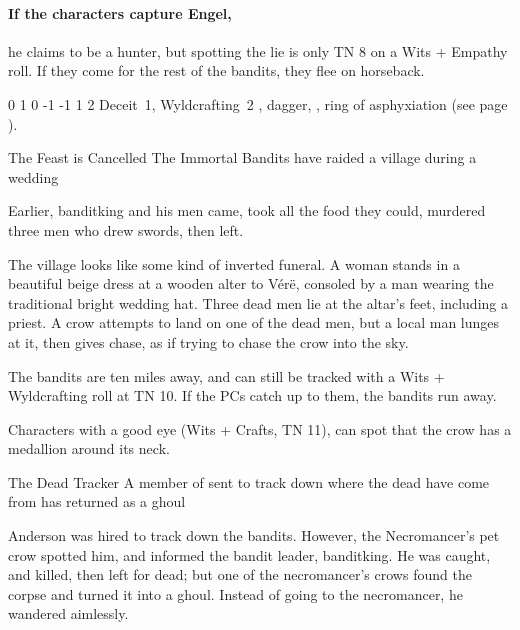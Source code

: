 \begin{multicols}{2}
\paragraph{If the characters capture Engel,}
he claims to be a hunter, but spotting the lie is only TN 8 on a Wits + Empathy roll.
If they come for the rest of the bandits, they flee on horseback.


{0}%
{1}%
{{0}%
{-1}%
{-1}}%
{1}%
{2}%
{Deceit~1, Wyldcrafting~2}%
{\shortsword, dagger, \partialleather, ring of asphyxiation (see page \pageref{ring_asphyxiation}).}%
{}

{The Feast is Cancelled}%
{The Immortal Bandits have raided a village during a wedding}%

Earlier, \gls{banditking} and his men came, took all the food they could, murdered three men who drew swords, then left.

\begin{boxtext}

	The village looks like some kind of inverted funeral.
	A woman stands in a beautiful beige dress at a wooden alter to V\'{e}r\"{e}, consoled by a man wearing the traditional bright wedding hat.
	Three dead men lie at the altar's feet, including a priest.
	A crow attempts to land on one of the dead men, but a local man lunges at it, then gives chase, as if trying to chase the crow into the sky.

\end{boxtext}

The bandits are ten miles away, and can still be tracked with a Wits + Wyldcrafting roll at TN 10.
If the PCs catch up to them, the bandits run away.

Characters with a good eye (Wits + Crafts, TN 11), can spot that the crow has a medallion around its neck.

{The Dead Tracker}%
{A member of  sent to track down where the dead have come from has returned as a ghoul}%

Anderson was hired to track down the bandits.
However, the Necromancer's pet crow spotted him, and informed the bandit leader, \gls{banditking}.
He was caught, and killed, then left for dead; but one of the necromancer's crows found the corpse and turned it into a ghoul.
Instead of going to the necromancer, he wandered aimlessly.


\end{multicols}
